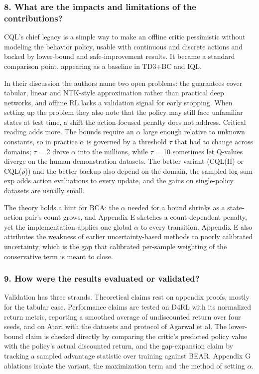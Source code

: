 \documentclass[11pt]{article}
\newcommand{\question}[1]{\subsubsection*{#1}}
\begin{document}
\question{8. What are the impacts and limitations of the contributions?}

CQL's chief legacy is a simple way to make an offline critic pessimistic without modeling the behavior policy, usable with continuous and discrete actions and backed by lower-bound and safe-improvement results. It became a standard comparison point, appearing as a baseline in TD3+BC and IQL.

In their discussion the authors name two open problems: the guarantees cover tabular, linear and NTK-style approximation rather than practical deep networks, and offline RL lacks a validation signal for early stopping. When setting up the problem they also note that the policy may still face unfamiliar states at test time, a shift the action-focused penalty does not address. Critical reading adds more. The bounds require an \ensuremath{\alpha} large enough relative to unknown constants, so in practice \ensuremath{\alpha} is governed by a threshold \ensuremath{\tau} that had to change across domains; \ensuremath{\tau} = 2 drove \ensuremath{\alpha} into the millions, while \ensuremath{\tau} = 10 sometimes let Q-values diverge on the human-demonstration datasets. The better variant (CQL(H) or CQL(\ensuremath{\rho})) and the better backup also depend on the domain, the sampled log-sum-exp adds action evaluations to every update, and the gains on single-policy datasets are usually small.

The theory holds a hint for BCA: the \ensuremath{\alpha} needed for a bound shrinks as a state-action pair's count grows, and Appendix E sketches a count-dependent penalty, yet the implementation applies one global \ensuremath{\alpha} to every transition. Appendix E also attributes the weakness of earlier uncertainty-based methods to poorly calibrated uncertainty, which is the gap that calibrated per-sample weighting of the conservative term is meant to close.

\question{9. How were the results evaluated or validated?}

Validation has three strands. Theoretical claims rest on appendix proofs, mostly for the tabular case. Performance claims are tested on D4RL with its normalized return metric, reporting a smoothed average of undiscounted return over four seeds, and on Atari with the datasets and protocol of Agarwal et al. The lower-bound claim is checked directly by comparing the critic's predicted policy value with the policy's actual discounted return, and the gap-expansion claim by tracking a sampled advantage statistic over training against BEAR. Appendix G ablations isolate the variant, the maximization term and the method of setting \ensuremath{\alpha}.
\end{document}
